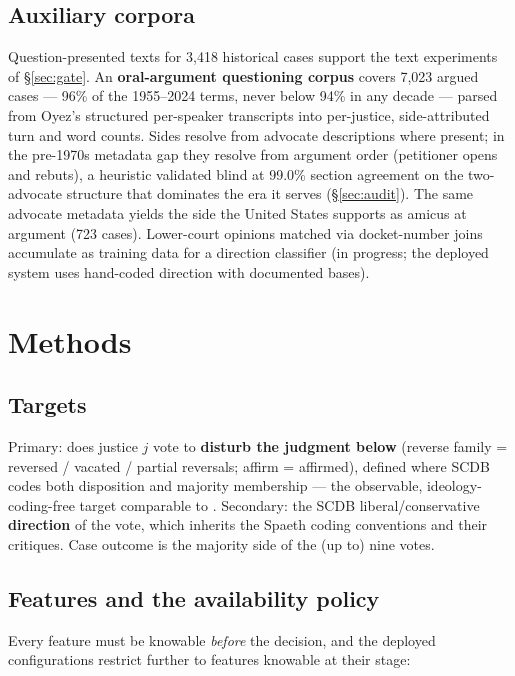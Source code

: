 \documentclass[11pt]{article}
\begin{document}
\subsection{Auxiliary corpora}\label{sec:oralcorpus}

Question-presented texts for 3{,}418 historical cases support the text
experiments of \S\ref{sec:gate}. An \textbf{oral-argument questioning corpus}
covers 7{,}023 argued cases --- 96\% of the 1955--2024 terms, never below 94\%
in any decade --- parsed from Oyez's structured per-speaker transcripts into
per-justice, side-attributed turn and word counts. Sides resolve from advocate
descriptions where present; in the pre-1970s metadata gap they resolve from
argument order (petitioner opens and rebuts), a heuristic validated blind at
99.0\% section agreement on the two-advocate structure that dominates the era
it serves (\S\ref{sec:audit}). The same advocate metadata yields the side the
United States supports as amicus at argument (723 cases). Lower-court opinions
matched via docket-number joins accumulate as training data for a direction
classifier (in progress; the deployed system uses hand-coded direction with
documented bases).

\section{Methods}\label{sec:methods}

\subsection{Targets}

Primary: does justice $j$ vote to \textbf{disturb the judgment below} (reverse
family = reversed / vacated / partial reversals; affirm = affirmed), defined
where SCDB codes both disposition and majority membership --- the observable,
ideology-coding-free target comparable to \citet{katz2017}. Secondary: the SCDB
liberal/conservative \textbf{direction} of the vote, which inherits the Spaeth
coding conventions and their critiques. Case outcome is the majority side of
the (up to) nine votes.

\subsection{Features and the availability policy}

Every feature must be knowable \emph{before} the decision, and the deployed
configurations restrict further to features knowable at their stage:
\end{document}
